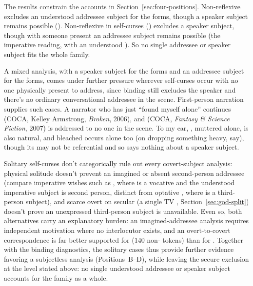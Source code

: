 \documentclass[12pt]{article}
\begin{document}
The results constrain the accounts in Section~\ref{sec:four-positions}. Non-reflexive  excludes an understood addressee subject for the  forms, though a speaker subject remains possible (). Non-reflexive  in self-curses () excludes a speaker subject, though with someone present an addressee subject remains possible (the imperative reading, with an understood ). So no single addressee or speaker subject fits the whole family.

A mixed analysis, with a speaker subject for the  forms and an addressee subject for the  forms, comes under further pressure wherever self-curses occur with no one physically present to address, since binding still excludes the speaker and there's no ordinary conversational addressee in the scene. First-person narration supplies such cases. A narrator who has just \enquote{found myself alone} continues  (COCA, Kelley Armstrong, \emph{Broken}, 2006), and  (COCA, \emph{Fantasy \& Science Fiction}, 2007) is addressed to no one in the scene. To my ear, , muttered alone, is also natural, and bleached  occurs alone too (on dropping something heavy, say), though its  may not be referential and so says nothing about a speaker subject.

Solitary self-curses don't categorically rule out every covert-subject analysis: physical solitude doesn't prevent an imagined or absent second-person addressee (compare imperative wishes such as , where  is a vocative and the understood imperative subject is second person, distinct from optative , where  is a third-person subject), and scarce overt  on secular  (a single TV , Section~\ref{sec:god-split}) doesn't prove an unexpressed third-person subject is unavailable. Even so, both alternatives carry an explanatory burden: an imagined-addressee analysis requires independent motivation where no interlocutor exists, and an overt-to-covert  correspondence is far better supported for  (140 non-  tokens) than for . Together with the binding diagnostics, the solitary cases thus provide further evidence favoring a subjectless analysis (Positions~B--D), while leaving the secure exclusion at the level stated above: no single understood addressee or speaker subject accounts for the family as a whole.
\end{document}
